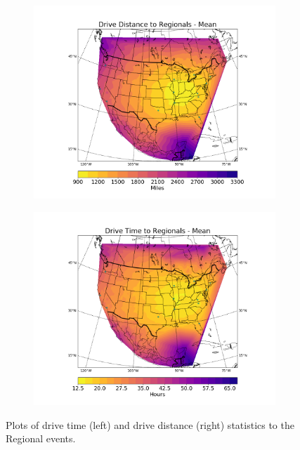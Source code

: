 \documentclass[11pt,twocolumn]{article}
\begin{document}
\begin{figure}
\begin{subfigure}{.5\textwidth}
  \includegraphics[height=.3\textheight]{../figs/Figure_7}
\end{subfigure}
\begin{subfigure}{.5\textwidth}
  \includegraphics[height=.3\textheight]{../figs/Figure_8}
\end{subfigure}
  \caption{Plots of drive time (left) and drive distance (right) statistics to the Regional events.}
\end{figure}
\end{document}

